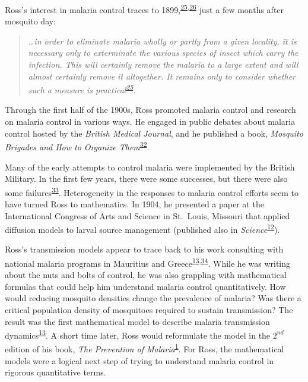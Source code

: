 \documentclass[
]{book}
\begin{document}
Ross's interest in malaria control traces to 1899,\textsuperscript{\protect\hyperlink{ref-RossR1899ExterminationMalaria}{25},\protect\hyperlink{ref-RossR1899InauguralLecture}{26}} just a few months after mosquito day:

\begin{quote}
\emph{\ldots in order to eliminate malaria wholly or partly from a given locality, it is necessary only to exterminate the various species of insect which carry the infection. This will certainly remove the malaria to a large extent and will almost certainly remove it altogether. It remains only to consider whether such a measure is practical\textsuperscript{\protect\hyperlink{ref-RossR1899ExterminationMalaria}{25}}.}
\end{quote}

Through the first half of the 1900s, Ross promoted malaria control and research on malaria control in various ways. He engaged in public debates about malaria control hosted by the \emph{British Medical Journal}, and he published a book, \emph{Mosquito Brigades and How to Organize Them}\textsuperscript{\protect\hyperlink{ref-RossR1902MosquitoBrigades}{32}}.

Many of the early attempts to control malaria were implemented by the British Military. In the first few years, there were some successes, but there were also some failures\textsuperscript{\protect\hyperlink{ref-RossR1907PreventionMalaria}{33}}. Heterogeneity in the responses to malaria control efforts seem to have turned Ross to mathematics. In 1904, he presented a paper at the International Congress of Arts and Science in St.~Louis, Missouri that applied diffusion models to larval source management (published also in \emph{Science}\textsuperscript{\protect\hyperlink{ref-RossR1905LogicalBasis}{12}}).

Ross's transmission models appear to trace back to his work consulting with national malaria programs in Mauritius and Greece\textsuperscript{\protect\hyperlink{ref-RossR1908}{13},\protect\hyperlink{ref-RossR1909}{34}}. While he was writing about the nuts and bolts of control, he was also grappling with mathematical formulas that could help him understand malaria control quantitatively. How would reducing mosquito densities change the prevalence of malaria? Was there a critical population density of mosquitoes required to sustain transmission? The result was the first mathematical model to describe malaria transmission dynamics\textsuperscript{\protect\hyperlink{ref-RossR1908}{13}}. A short time later, Ross would reformulate the model in the \(2^{nd}\) edition of his book, \emph{The Prevention of Malaria}\textsuperscript{\protect\hyperlink{ref-RossR1911Book}{1}}. For Ross, the mathematical models were a logical next step of trying to understand malaria control in rigorous quantitative terms.
\end{document}
